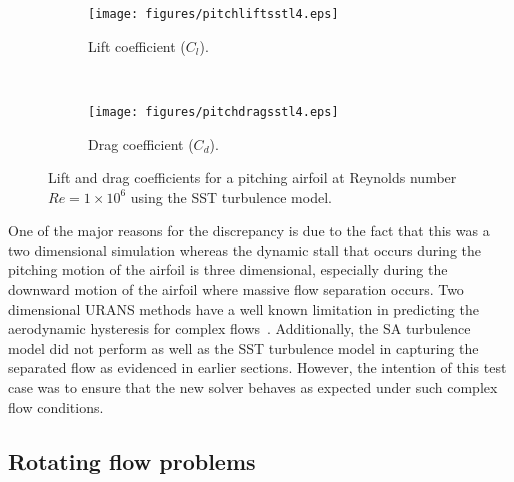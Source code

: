 \begin{figure}[h!]
    \centering
    \captionsetup{justification=centering}
    \begin{subfigure}[b]{0.48\textwidth}
    \captionsetup{justification=centering}
        \texttt{[image: figures/pitchliftsstl4.eps]}    
    \caption{Lift coefficient ($C_l$).}
    \label{fig:pitchclsst}
    \end{subfigure}
    ~ %
    \begin{subfigure}[b]{0.48\textwidth}
    \centering
    \captionsetup{justification=centering}
        \texttt{[image: figures/pitchdragsstl4.eps]}
        \caption{Drag coefficient ($C_d$).}
    \label{fig:pitchcdsst}
    \end{subfigure}
    \caption{Lift and drag coefficients for a pitching airfoil at Reynolds number $Re=1\times10^6$ using the SST turbulence model.}
\end{figure}

One of the major reasons for the discrepancy is due to the fact that this was a two dimensional simulation whereas the dynamic stall that occurs during the pitching motion of the airfoil is three dimensional, especially during the downward motion of the airfoil where massive flow separation occurs. Two dimensional URANS methods have a well known limitation in predicting the aerodynamic hysteresis for complex flows~\cite{wang2010numerical, martinat2008turbulence}. Additionally, the SA turbulence model did not perform as well as the SST turbulence model in capturing the separated flow as evidenced in earlier sections. However, the intention of this test case was to ensure that the new solver behaves as expected under such complex flow conditions.

\subsection{Rotating flow problems}
